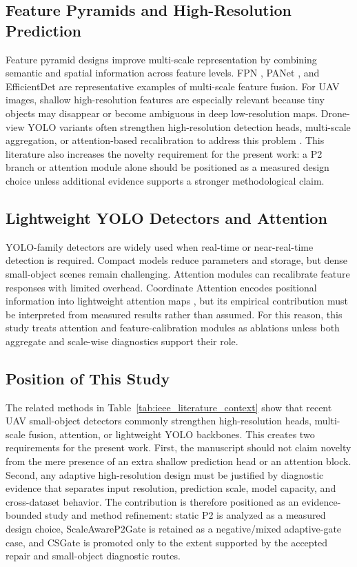 \documentclass[journal]{IEEEtran}
\begin{document}
\subsection{Feature Pyramids and High-Resolution Prediction}

Feature pyramid designs improve multi-scale representation by combining semantic and spatial information across feature levels. FPN \cite{lin2017fpn}, PANet \cite{liu2018panet}, and EfficientDet \cite{tan2020efficientdet} are representative examples of multi-scale feature fusion. For UAV images, shallow high-resolution features are especially relevant because tiny objects may disappear or become ambiguous in deep low-resolution maps. Drone-view YOLO variants often strengthen high-resolution detection heads, multi-scale aggregation, or attention-based recalibration to address this problem \cite{zhu2021tph_yolov5,li2024sod_yolo,khalili2024sod_yolov8,qu2025sma_yolo,lu2025masf_yolo,xu2025srtsod_yolo}. This literature also increases the novelty requirement for the present work: a P2 branch or attention module alone should be positioned as a measured design choice unless additional evidence supports a stronger methodological claim.

\subsection{Lightweight YOLO Detectors and Attention}

YOLO-family detectors are widely used when real-time or near-real-time detection is required. Compact models reduce parameters and storage, but dense small-object scenes remain challenging. Attention modules can recalibrate feature responses with limited overhead. Coordinate Attention encodes positional information into lightweight attention maps \cite{hou2021coordinate_attention}, but its empirical contribution must be interpreted from measured results rather than assumed. For this reason, this study treats attention and feature-calibration modules as ablations unless both aggregate and scale-wise diagnostics support their role.

\subsection{Position of This Study}

The related methods in Table~\ref{tab:ieee_literature_context} show that recent UAV small-object detectors commonly strengthen high-resolution heads, multi-scale fusion, attention, or lightweight YOLO backbones. This creates two requirements for the present work. First, the manuscript should not claim novelty from the mere presence of an extra shallow prediction head or an attention block. Second, any adaptive high-resolution design must be justified by diagnostic evidence that separates input resolution, prediction scale, model capacity, and cross-dataset behavior. The contribution is therefore positioned as an evidence-bounded study and method refinement: static P2 is analyzed as a measured design choice, ScaleAwareP2Gate is retained as a negative/mixed adaptive-gate case, and CSGate is promoted only to the extent supported by the accepted repair and small-object diagnostic routes.
\end{document}
